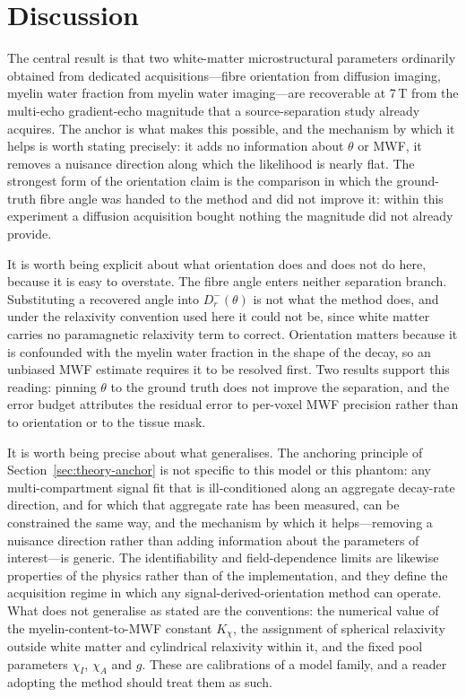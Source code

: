\documentclass[AMA,STIX2COL,Linenumberson]{MRM}
\begin{document}
\section{Discussion}

The central result is that two white-matter microstructural parameters ordinarily obtained from dedicated acquisitions---fibre orientation from diffusion imaging, myelin water fraction from myelin water imaging---are recoverable at 7\,T from the multi-echo gradient-echo magnitude that a source-separation study already acquires. The anchor is what makes this possible, and the mechanism by which it helps is worth stating precisely: it adds no information about $\theta$ or MWF, it removes a nuisance direction along which the likelihood is nearly flat. The strongest form of the orientation claim is the comparison in which the ground-truth fibre angle was handed to the method and did not improve it: within this experiment a diffusion acquisition bought nothing the magnitude did not already provide.

It is worth being explicit about what orientation does and does not do here, because it is easy to overstate. The fibre angle enters neither separation branch. Substituting a recovered angle into $D_r^{-}(\theta)$ is not what the method does, and under the relaxivity convention used here it could not be, since white matter carries no paramagnetic relaxivity term to correct. Orientation matters because it is confounded with the myelin water fraction in the shape of the decay, so an unbiased MWF estimate requires it to be resolved first. Two results support this reading: pinning $\theta$ to the ground truth does not improve the separation, and the error budget attributes the residual error to per-voxel MWF precision rather than to orientation or to the tissue mask.

It is worth being precise about what generalises. The anchoring principle of Section~\ref{sec:theory-anchor} is not specific to this model or this phantom: any multi-compartment signal fit that is ill-conditioned along an aggregate decay-rate direction, and for which that aggregate rate has been measured, can be constrained the same way, and the mechanism by which it helps---removing a nuisance direction rather than adding information about the parameters of interest---is generic. The identifiability and field-dependence limits are likewise properties of the physics rather than of the implementation, and they define the acquisition regime in which any signal-derived-orientation method can operate. What does not generalise as stated are the conventions: the numerical value of the myelin-content-to-MWF constant $K_\chi$, the assignment of spherical relaxivity outside white matter and cylindrical relaxivity within it, and the fixed pool parameters $\chi_I$, $\chi_A$ and $g$. These are calibrations of a model family, and a reader adopting the method should treat them as such.
\end{document}

